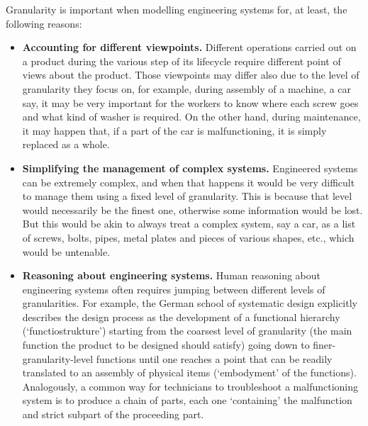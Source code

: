 \documentclass[
]{ceurart}
\begin{document}
Granularity is important when modelling engineering systems for, at least, the following reasons:
\begin{itemize}
    \item \textbf{Accounting for different viewpoints.} Different operations carried out on a product during the various step of its lifecycle require different point of views about the product. Those viewpoints may differ also due to the level of granularity they focus on, for example, during assembly of a machine, a car say, it may be very important for the workers to know where each screw goes and what kind of washer is required. On the other hand, during maintenance, it may happen that, if a part of the car is malfunctioning, it is simply replaced as a whole.%
    \item \textbf{Simplifying the management of complex systems.} Engineered systems can be extremely complex, and when that happens it would be very difficult to manage them using a fixed level of granularity. This is because that level would necessarily be the finest one, otherwise some information would be lost. But this would be akin to always treat a complex system, say a car, as a list of screws, bolts, pipes, metal plates and pieces of various shapes, etc., which would be untenable. 
    \item \textbf{Reasoning about engineering systems.} Human reasoning about engineering systems often requires jumping between different levels of granularities. For example, the German school of systematic design \cite{pahl_engineering_2007} explicitly describes the design process as the development of a functional hierarchy (`functiostrukture') starting from the coarsest level of granularity (the main function the product to be designed should satisfy) going down to finer-granularity-level functions until one reaches a point that can be readily translated to an assembly of physical items (`embodyment' of the functions). Analogously, a common way for technicians to troubleshoot a malfunctioning system is to produce a chain of parts, each one `containing' the malfunction and strict subpart of the proceeding part. %

\end{itemize}
\end{document}
